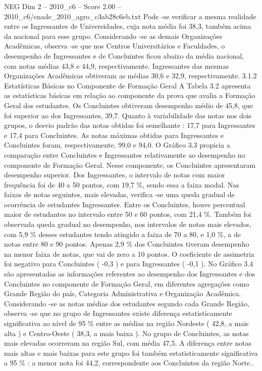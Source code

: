 \begin{textsample}{NEG Dim 2 – 2010\_c6 – Score 2.00 – 2010\_c6/enade\_2010\_agro\_c3ab28c6eb.txt}
Pode -se verificar a mesma realidade entre os Ingressantes de Universidades, cuja nota média foi 38,3, também acima da nacional para esse grupo.
Considerando -se as demais Organizações Acadêmicas, observa -se que nos Centros Universitários e Faculdades, o desempenho de Ingressantes e de Concluintes ficou abaixo da média nacional, com notas médias 43,8 e 44,9, respectivamente.
Ingressantes das mesmas Organizações Acadêmicas obtiveram as médias 30,6 e 32,9, respectivamente. 3.1.2 Estatísticas Básicas no Componente de Formação Geral A Tabela 3.2 apresenta as estatísticas básicas em relação ao componente da prova que avalia a Formação Geral dos estudantes.
Os Concluintes obtiveram desempenho médio de 45,8, que foi superior ao dos Ingressantes, 39,7.
Quanto à variabilidade das notas nos dois grupos, o desvio padrão das notas obtidas foi semelhante : 17,7 para Ingressantes e 17,4 para Concluintes.
As notas máximas obtidas para Ingressantes e Concluintes foram, respectivamente, 99,0 e 94,0.
O Gráfico 3.3 propicia a comparação entre Concluintes e Ingressantes relativamente ao desempenho no componente de Formação Geral.
Nesse componente, os Concluintes apresentaram desempenho superior.
Dos Ingressantes, o intervalo de notas com maior frequência foi de 40 a 50 pontos, com 19,7 \%, sendo essa a faixa modal.
Nas faixas de notas seguintes, mais elevadas, verifica -se uma queda gradual de ocorrência de estudantes Ingressantes.
Entre os Concluintes, houve percentual maior de estudantes no intervalo entre 50 e 60 pontos, com 21,4 \%.
Também foi observada queda gradual no desempenho, nos intervalos de notas mais elevados, com 5,9 \% desses estudantes tendo atingido a faixa de 70 a 80, e 1,0 \%, a de notas entre 80 e 90 pontos.
Apenas 2,9 \% dos Concluintes tiveram desempenho na menor faixa de notas, que vai de zero a 10 pontos.
O coeficiente de assimetria foi negativo para Concluintes ( -0,3 ) e para Ingressantes ( -0,1 ).
No Gráfico 3.4 são apresentadas as informações referentes ao desempenho dos Ingressantes e dos Concluintes no componente de Formação Geral, em diferentes agregações como Grande Região do país, Categoria Administrativa e Organização Acadêmica.
Considerando -se as notas médias dos estudantes segundo cada Grande Região, observa -se que no grupo de Ingressantes existe diferença estatisticamente significativa ao nível de 95 \% entre as médias na região Nordeste ( 42,8, a mais alta ) e Centro-Oeste ( 38,3, a mais baixa ).
No grupo de Concluintes, as notas mais elevadas ocorreram na região Sul, com média 47,5.
A diferença entre notas mais altas e mais baixas para este grupo foi também estatisticamente significativa a 95 \% : a menor nota foi 44,2, correspondente aos Concluintes da região Norte..

\end{textsample}
